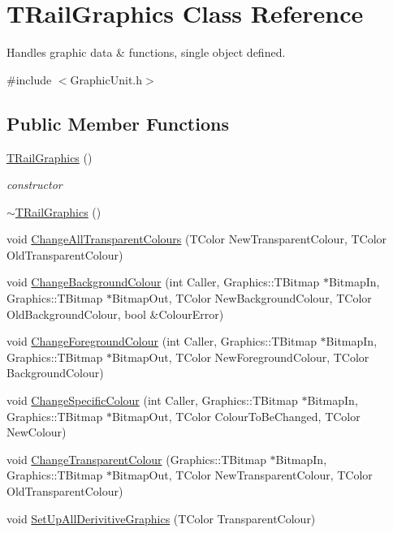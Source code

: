 \hypertarget{class_t_rail_graphics}{}\section{T\+Rail\+Graphics Class Reference}
\label{class_t_rail_graphics}


Handles graphic data \& functions, single object defined.  




{\ttfamily \#include $<$Graphic\+Unit.\+h$>$}

\subsection*{Public Member Functions}
\begin{DoxyCompactItemize}
\item 
\mbox{\label{class_t_rail_graphics_acd3dfcf9686870772b1708030f11b1d4}} 
\mbox{\hyperlink{class_t_rail_graphics_acd3dfcf9686870772b1708030f11b1d4}{T\+Rail\+Graphics}} ()
\begin{DoxyCompactList}\small\item\em constructor \end{DoxyCompactList}\item 
\mbox{\hyperlink{class_t_rail_graphics_ad243415e657236ecca97fa1d064cf127}{$\sim$\+T\+Rail\+Graphics}} ()
\item 
void \mbox{\hyperlink{class_t_rail_graphics_a5121c6d8b8fa69eefc293ca51cddce88}{Change\+All\+Transparent\+Colours}} (T\+Color New\+Transparent\+Colour, T\+Color Old\+Transparent\+Colour)
\item 
void \mbox{\hyperlink{class_t_rail_graphics_a74d7dcd5e17ef156d8c216c8e524de11}{Change\+Background\+Colour}} (int Caller, Graphics\+::\+T\+Bitmap $\ast$Bitmap\+In, Graphics\+::\+T\+Bitmap $\ast$Bitmap\+Out, T\+Color New\+Background\+Colour, T\+Color Old\+Background\+Colour, bool \&Colour\+Error)
\item 
void \mbox{\hyperlink{class_t_rail_graphics_aa2dace651659e084ec23c9961f5819b1}{Change\+Foreground\+Colour}} (int Caller, Graphics\+::\+T\+Bitmap $\ast$Bitmap\+In, Graphics\+::\+T\+Bitmap $\ast$Bitmap\+Out, T\+Color New\+Foreground\+Colour, T\+Color Background\+Colour)
\item 
void \mbox{\hyperlink{class_t_rail_graphics_ac4e48e6ee19e01724adb0d490762d548}{Change\+Specific\+Colour}} (int Caller, Graphics\+::\+T\+Bitmap $\ast$Bitmap\+In, Graphics\+::\+T\+Bitmap $\ast$Bitmap\+Out, T\+Color Colour\+To\+Be\+Changed, T\+Color New\+Colour)
\item 
void \mbox{\hyperlink{class_t_rail_graphics_a89a3e3a91129c4d02f4606478781b519}{Change\+Transparent\+Colour}} (Graphics\+::\+T\+Bitmap $\ast$Bitmap\+In, Graphics\+::\+T\+Bitmap $\ast$Bitmap\+Out, T\+Color New\+Transparent\+Colour, T\+Color Old\+Transparent\+Colour)
\item 
void \mbox{\hyperlink{class_t_rail_graphics_ae19696d461eea07c5444ed4c9714acf3}{Set\+Up\+All\+Derivitive\+Graphics}} (T\+Color Transparent\+Colour)
\end{DoxyCompactItemize}
